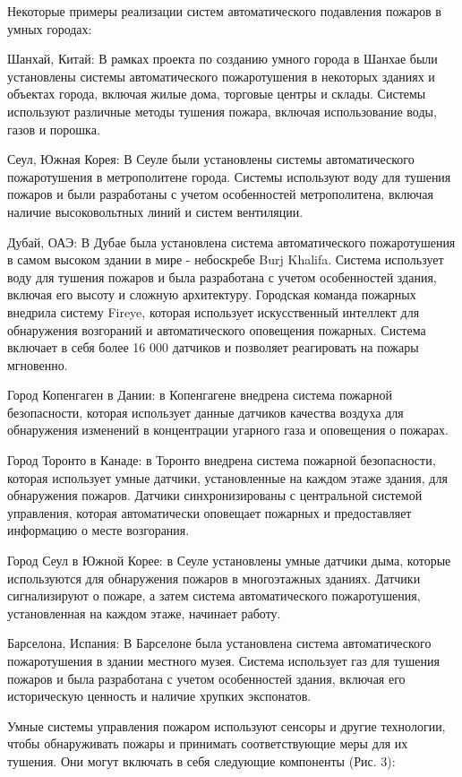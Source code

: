 \begin{multicols}{2}
Некоторые примеры реализации систем автоматического подавления пожаров в
умных городах:

Шанхай, Китай: В рамках проекта по созданию умного города в Шанхае
были установлены системы автоматического пожаротушения в некоторых
зданиях и объектах города, включая жилые дома, торговые центры и
склады. Системы используют различные методы тушения пожара, включая
использование воды, газов и порошка.

Сеул, Южная Корея: В Сеуле были установлены системы автоматического
пожаротушения в метрополитене города. Системы используют воду для
тушения пожаров и были разработаны с учетом особенностей
метрополитена, включая наличие высоковольтных линий и систем
вентиляции.

Дубай, ОАЭ: В Дубае была установлена система автоматического
пожаротушения в самом высоком здании в мире - небоскребе Burj Khalifa.
Система использует воду для тушения пожаров и была разработана с
учетом особенностей здания, включая его высоту и сложную архитектуру.
Городская команда пожарных внедрила систему Fireye, которая использует
искусственный интеллект для обнаружения возгораний и автоматического
оповещения пожарных. Система включает в себя более 16 000 датчиков и
позволяет реагировать на пожары мгновенно.

Город Копенгаген в Дании: в Копенгагене внедрена система пожарной
безопасности, которая использует данные датчиков качества воздуха для
обнаружения изменений в концентрации угарного газа и оповещения о
пожарах.

Город Торонто в Канаде: в Торонто внедрена система пожарной
безопасности, которая использует умные датчики, установленные на
каждом этаже здания, для обнаружения пожаров. Датчики синхронизированы
с центральной системой управления, которая автоматически оповещает
пожарных и предоставляет информацию о месте возгорания.

Город Сеул в Южной Корее: в Сеуле установлены умные датчики дыма,
которые используются для обнаружения пожаров в многоэтажных зданиях.
Датчики сигнализируют о пожаре, а затем система автоматического
пожаротушения, установленная на каждом этаже, начинает работу.

Барселона, Испания: В Барселоне была установлена система
автоматического пожаротушения в здании местного музея. Система
использует газ для тушения пожаров и была разработана с учетом
особенностей здания, включая его историческую ценность и наличие
хрупких экспонатов.

Умные системы управления пожаром используют сенсоры и другие технологии,
чтобы обнаруживать пожары и принимать соответствующие меры для их
тушения. Они могут включать в себя следующие компоненты (Рис. 3):


\end{multicols}
